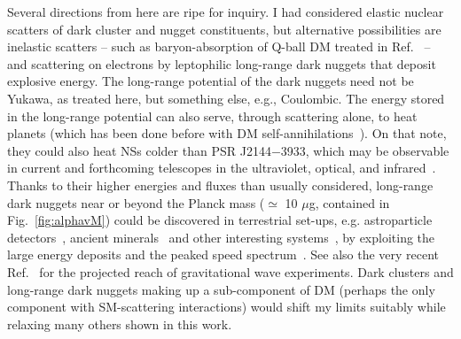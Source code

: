 \documentclass[
    twocolumn,
	prd,
        amssymb,
	preprintnumbers,
	secnumarabic,
	nofootinbib,
	superscriptaddress]{revtex4-1}
\begin{document}
Several directions from here are ripe for inquiry.
I had considered elastic nuclear scatters of dark cluster and nugget constituents, but alternative possibilities are inelastic scatters -- such as baryon-absorption of Q-ball DM treated in Ref.~\cite{Graham:2018efk} -- and scattering on electrons by leptophilic long-range dark nuggets that deposit explosive energy.
The long-range potential of the dark nuggets need not be Yukawa, as treated here, but something else, e.g., Coulombic.
The energy stored in the long-range potential can also serve, through scattering alone, to heat planets (which has been done before with DM self-annihilations~\cite{GlobalWarming:Kawasaki:1991eu,GlobalWarming:Abbas:1996kk,GlobalWarming:Mack:2007xj,GlobalWarming:Hooper:2011dw,GlobalWarming:Garani:2019rcb,GlobalWarming:Bramante:2019fhi,GlobalWarming:Acevedo:2020gro,GlobalWarming:Leane:2020wob,GlobalWarming:Bramante:2022pmn}). 
On that note, they could also heat NSs colder than PSR J2144$-$3933, which may be observable in current and forthcoming telescopes in the ultraviolet, optical, and infrared~\cite{NSvIR:Baryakhtar:DKHNS,NSvIR:clumps2021,McKeen:2020oyr,McKeen:2021jbh,theluvoirteam2019luvoir,DES:2019rtl,Rubin1,Rubin2,JWST:Gardner:2006ky,ELT:neichel2018overview,TMT:2015pvw,green2012widefield}.
Thanks to their higher energies and fluxes than usually considered, long-range dark nuggets near or beyond the Planck mass ($\simeq$ 10 $\mu$g, contained in Fig.~\ref{fig:alphavM}) could be discovered in terrestrial set-ups, e.g. 
astroparticle detectors~\cite{MACRO:2000cdb,Bramante:2018qbc,Bramante:2018tos,Bramante:2019yss,Cappiello:2020lbk,BlobsGrabowska:2018lnd,Bai:2022nsv,Bhoonah:2020fys,xmaslights:DEAPCollaboration:2021raj,XENON:2023ysy,snowmass:Carney:2022gse},
ancient minerals~\cite{Snowden-Ifft:1995zgn,Baum:2018tfw,Drukier:2018pdy,Acevedo:2021tbl,Baum:2023cct} and other interesting systems~\cite{SinghSidhu:2018oqs,SinghSidhu:2019cpq,SinghSidhu:2019loh,SinghSidhu:2019znk,Dhakal:2022rwn}, by exploiting the large energy deposits and the peaked speed spectrum~\cite{Davoudiasl:2020ypv}.
See also the very recent Ref.~\cite{GWDuLeeWangZurek:2023dhk} for the projected reach of gravitational wave experiments.
Dark clusters and long-range dark nuggets making up a sub-component of DM (perhaps the only component with SM-scattering interactions) would shift my limits suitably while relaxing many others shown in this work.
\end{document}
